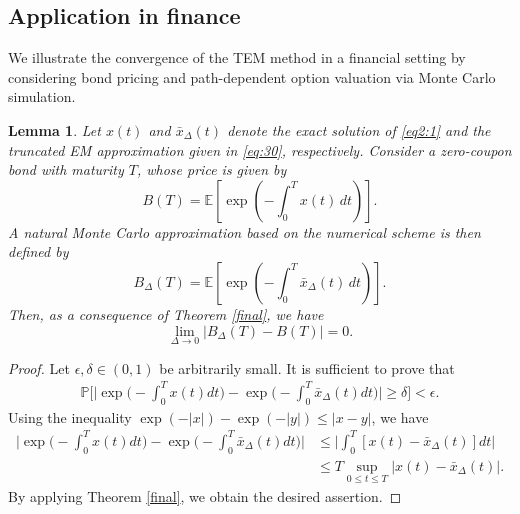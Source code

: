 \documentclass[11pt]{article}
\newtheorem{lemma}[definition]{Lemma}
\begin{document}
\subsection{Application in finance}
We illustrate the convergence of the TEM method in a financial setting by considering bond pricing and path-dependent option valuation via Monte Carlo simulation.
\begin{lemma}
Let $x(t)$ and $\bar{x}_{\Delta}(t)$ denote the exact solution of \eqref{eq2:1} and the truncated EM approximation given in \eqref{eq:30}, respectively. Consider a zero-coupon bond with maturity $T$, whose price is given by
\begin{equation}\label{eq:52}
B(T) = \mathbb{E}\left[\exp\left(-\int_{0}^{T} x(t)\,dt\right)\right].
\end{equation}
A natural Monte Carlo approximation based on the numerical scheme is then defined by
\begin{equation}\label{eq:52*}
B_{\Delta}(T) = \mathbb{E}\left[\exp\left(-\int_{0}^{T} \bar{x}_{\Delta}(t)\,dt\right)\right].
\end{equation}
Then, as a consequence of Theorem \ref{final}, we have
\begin{equation*}
\lim_{\Delta \to 0} \left| B_{\Delta}(T) - B(T) \right| = 0.
\end{equation*}
\end{lemma}
\begin{proof}
Let $\epsilon, \delta\in (0,1)$ be arbitrarily small. It is sufficient to prove that 
\begin{align*}
\mathbb{P}\Big[\Big\vert \exp\Big(-\int_{0}^{T}x(t)dt\Big)- \exp\Big(-\int_{0}^{T}\bar{x}_{\Delta}(t)dt\Big) \Big\vert\ge \delta\Big]<\epsilon.
\end{align*}
Using the inequality $ \exp(-\vert x\vert)-\exp(-\vert y\vert)\le \vert x-y \vert$, we have
\begin{align*}
\Big\vert \exp\Big(-\int_{0}^{T}x(t)dt\Big)- \exp\Big(-\int_{0}^{T}\bar{x}_{\Delta}(t)dt\Big) \Big\vert&\le \Big\vert \int_{0}^{T}[x(t)-\bar{x}_{\Delta}(t)]dt \Big\vert\\
&\le T\sup_{0\le t\le T}\vert x(t)-\bar{x}_{\Delta}(t)\vert.
\end{align*}
By applying  Theorem \ref{final}, we obtain the desired assertion.
\end{proof}
\end{document}
